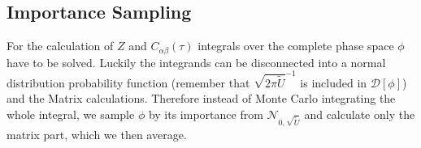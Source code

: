 \subsection{Importance Sampling}
For the calculation of $Z$ and $C_{\alpha\beta}(\tau)$ integrals over the complete phase space $\phi$ have to be solved. Luckily the integrands can be disconnected into a normal distribution probability function (remember that $\sqrt{2\pi\tilde{U}}^{-1}$ is included in $\mathcal{D}[\phi]$) and the Matrix calculations.
Therefore instead of Monte Carlo integrating the whole integral, we sample $\phi$ by its importance from $\mathcal{N}_{0, \sqrt{\tilde{U}}}$ and calculate only the matrix part, which we then average.